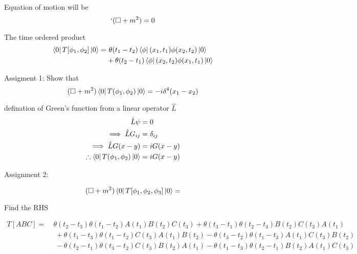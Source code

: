 \documentclass[12pt, letterpaper]{article}
\newcommand*{\1}{\hspace{1pt}}
\begin{document}
    Equation of motion will be 
    \begin{equation}`
        (\Box + m^{2}) = 0
    \end{equation}

    The time ordered product 
    \begin{equation}
        \begin{split}
            \bra 0  T[\phi _{1}, \phi _{2}]  \ket 0 =  &  \ \theta (t_{1}-t_{2}) \bra  \phi(x_{1},t_{1}) \phi (x_{2}, t{_2})  \ket 0 \\
            & + \theta (t_{2}-t_{1}) \bra  \phi(x_{2},t_{2}) \phi (x_{1}, t{_1})  \ket 0
        \end{split}
    \end{equation}

    Assigment 1: Show that 
    \begin{equation}
        (\Box + m^{2}) \bra {0} T(\phi _{1}, \phi _{2}) \ket {0} = -i \delta^{4} (x_{1}-x_{2})
    \end{equation}

    defination of Green's function from a linear operator $\hat L$
    \begin{equation}
        \begin{split}
            \hat {L} \psi & = 0 \\
            \implies \hat L G_{ij} & = \delta_{ij} \\
            \implies \hat L G(x-y) & = iG(x-y) \\
            \therefore \bra {0} T(\phi_{1}, \phi_{2}) \ket {0} & = iG(x-y)  
        \end{split}  
    \end{equation}

    Assignment 2:

    \begin{equation}
        (\Box + m^{2})\bra {0} T[\phi_{1}, \phi _{2}, \phi _{3}] \ket {0} = 
    \end{equation}

    Find the RHS

    \begin{equation}
    \begin{split}
        T[ABC] = &  \ \theta(t_{2} - t_{3})\theta (t_{1} - t_{2})A(t_{1})B(t_{2})C(t_{3}) + \theta(t_{3} - t_{1})\theta (t_{2} - t_{3})B(t_{2})C(t_{3})A(t_{1}) \\
        & \ \  + \theta(t_{1} - t_{3})\theta (t_{1} - t_{2})C(t_{3})A(t_{1})B(t_{2}) - \theta(t_{3} - t_{2})\theta (t_{1} - t_{3})A(t_{1})C(t_{3})B(t_{2}) \\
        & \ \  - \theta(t_{2} - t_{1})\theta (t_{3} - t_{2})C(t_{3})B(t_{2})A(t_{1}) - \theta(t_{1} - t_{3})\theta (t_{2} - t_{1})B(t_{2})A(t_{1})C(t_{3}) \\ 
    \end{split}
    \end{equation}
\end{document}
